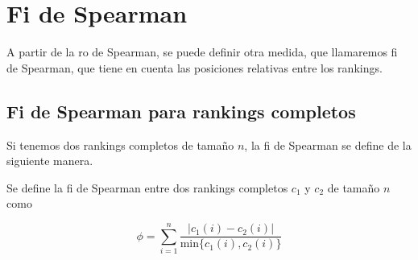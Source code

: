 \section{Fi de Spearman}

A partir de la ro de Spearman, se puede definir otra medida, que llamaremos fi de Spearman, que tiene en cuenta las posiciones relativas entre los rankings.

\subsection{Fi de Spearman para rankings completos}

Si tenemos dos rankings completos de tamaño $n$, la fi de Spearman se define de la siguiente manera.

\begin{defi}
Se define la fi de Spearman entre dos rankings completos $c_1$ y $c_2$ de tamaño $n$ como 

\begin{equation}
\phi = \sum\limits_{i=1}^{n} \dfrac{|c_1(i) - c_2(i)|}{\mathrm{min}\{c_1(i), c_2(i)\}}
\end{equation}
\end{defi}


